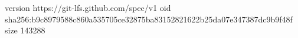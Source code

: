 version https://git-lfs.github.com/spec/v1
oid sha256:b9c8979588c860a535705ce32875ba83152821622b25da07e347387dc9b9f48f
size 143288
